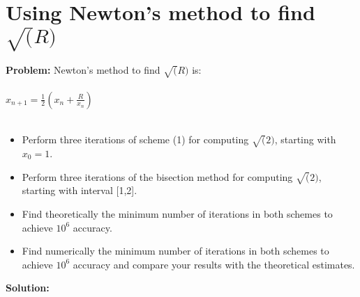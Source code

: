 \newpage

\section{Using Newton's method to find $\sqrt(R)$ }%
\label{sec:newton_s_method_to_find_sqrt_r_}

\textbf{Problem:}
Newton's method to find $\sqrt(R)$ is:\\
\\
$x_{n+1} = \frac{1}{2} (x_n + \frac{R}{x_n})$ \\
\\
\begin{itemize}
    \item Perform three iterations of scheme (1) for computing $\sqrt(2)$, starting with $x_0 = 1$.
    \item Perform three iterations of the bisection method for computing $\sqrt(2)$, starting with interval [1,2].
    \item Find theoretically the minimum number of iterations in both schemes to achieve $10^6$ accuracy.
    \item Find numerically the minimum number of iterations in both schemes to achieve $10^6$ accuracy and compare your results with the theoretical estimates.
\end{itemize}

\textbf{Solution:}

\newpage

